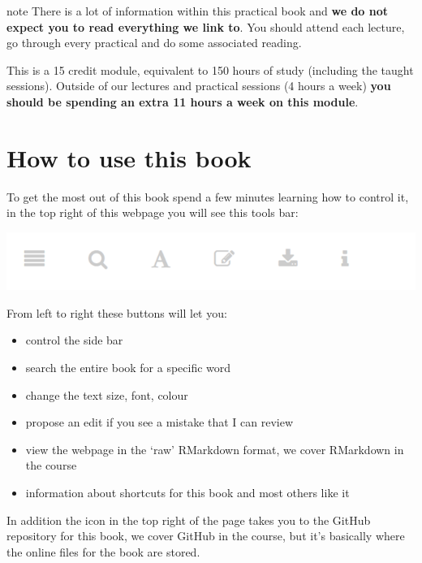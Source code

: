 \documentclass[
]{book}
\begin{document}
\begin{infobox}{note}
There is a lot of information within this practical book and \textbf{we do not expect you to read everything we link to}. You should attend each lecture, go through every practical and do some associated reading.

This is a 15 credit module, equivalent to 150 hours of study (including the taught sessions). Outside of our lectures and practical sessions (4 hours a week) \textbf{you should be spending an extra 11 hours a week on this module}.

\end{infobox}

\hypertarget{how-to-use-this-book}{%
\section*{How to use this book}\label{how-to-use-this-book}}

To get the most out of this book spend a few minutes learning how to control it, in the top right of this webpage you will see this tools bar:

\begin{center}\includegraphics[width=600pt]{general_images/Book_controls} \end{center}

From left to right these buttons will let you:

\begin{itemize}
\item
  control the side bar
\item
  search the entire book for a specific word
\item
  change the text size, font, colour
\item
  propose an edit if you see a mistake that I can review
\item
  view the webpage in the `raw' RMarkdown format, we cover RMarkdown in the course
\item
  information about shortcuts for this book and most others like it
\end{itemize}

In addition the icon in the top right of the page takes you to the GitHub repository for this book, we cover GitHub in the course, but it's basically where the online files for the book are stored.
\end{document}
